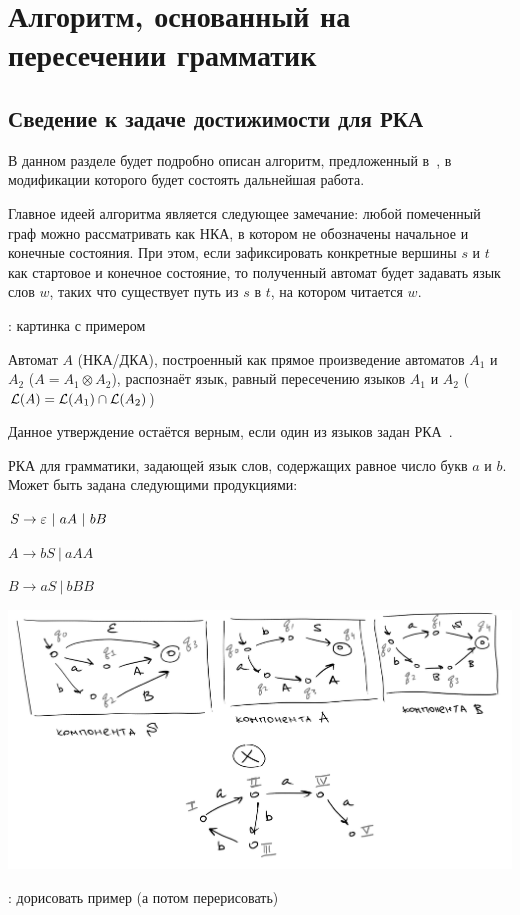 \section{Алгоритм, основанный на пересечении грамматик}

\subsection{Сведение к задаче достижимости для РКА}

    В данном разделе будет подробно описан алгоритм, предложенный в~\cite{Orachev20}, в модификации которого будет состоять дальнейшая работа.

    Главное идеей алгоритма является следующее замечание: любой помеченный граф можно рассматривать как НКА, в котором не обозначены начальное и конечные состояния. При этом, если зафиксировать конкретные вершины $s$ и $t$ как стартовое и конечное состояние, то полученный автомат будет задавать язык слов $w$, таких что существует путь из $s$ в $t$, на котором читается $w$. 

    \TODO: картинка с примером

    \begin{proposition} \cite{Hopcroft1979}

    Автомат $A$ (НКА/ДКА), построенный как прямое произведение автоматов $A_1$ и $A_2$ ($A = A_1 \otimes A_2$), распознаёт язык, равный пересечению языков $A_1$ и $A_2$ ($\mathcal{L}(A) = \mathcal{L}(A_1) \cap \mathcal{L}(A_2)$)

    \end{proposition}

    Данное утверждение остаётся верным, если один из языков задан РКА~\cite{Beigel}.

    \begin{example}
        РКА для грамматики, задающей язык слов, содержащих равное число букв $a$ и $b$. Может быть задана следующими продукциями:

        $S \rightarrow \varepsilon~|~aA~|~bB$

        $A \to bS~|~aAA$
        
        $B \to aS~|~bBB$

        \includegraphics[width=1\linewidth]{img/example_intersection1.png}

        \TODO: дорисовать пример (а потом перерисовать)

    \end{example}

